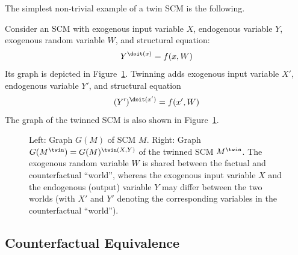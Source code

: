 The simplest non-trivial example of a twin SCM is the following.
\begin{Eg}
  Consider an SCM with exogenous input variable $X$, endogenous variable $Y$, exogenous random variable $W$, and
  structural equation:
  $$Y^{\doit(x)} = f(x,W)$$
  Its graph is depicted in Figure~\ref{fig:twin_SCM}.
  Twinning adds exogenous input variable $X'$, endogenous variable $Y'$, and structural equation
  $$(Y')^{\doit(x')} = f(x',W)$$
  The graph of the twinned SCM is also shown in Figure~\ref{fig:twin_SCM}.
  
  \begin{figure}\centering
    \caption{Left: Graph $G(M)$ of SCM $M$. Right: Graph $G(M^{\twin}) = G(M)^{\twin(X,Y)}$ of the twinned SCM $M^\twin$.
    The exogenous random variable $W$ is shared between the factual and counterfactual ``world'', whereas the exogenous
    input variable $X$ and the endogenous (output) variable $Y$ may differ between the two worlds (with $X'$ and $Y'$ denoting the corresponding variables in the counterfactual ``world'').\label{fig:twin_SCM}}
\end{figure}
\end{Eg}

\subsection{Counterfactual Equivalence}

